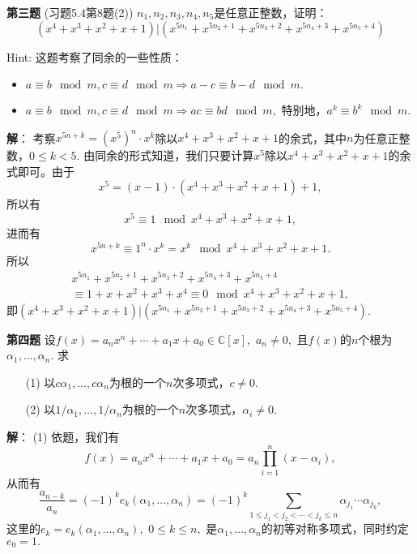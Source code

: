 \fi  %

\newpageorvspace

{\bf 第三题} (习题5.4第8题(2)) $n_1, n_2, n_3, n_4, n_5$是任意正整数，证明：
$$(x^4 + x^3 + x^2 + x + 1) | (x^{5n_1} + x^{5n_2+1} + x^{5n_3+2} + x^{5n_4+3} + x^{5n_5+4})$$

Hint: 这题考察了同余的一些性质：
\begin{itemize}
\item $a \equiv b \mod{m}, c \equiv d \mod{m} \Rightarrow a-c \equiv b-d \mod{m}.$
\item $a \equiv b \mod{m}, c \equiv d \mod{m} \Rightarrow ac \equiv bd \mod{m},$ 特别地，$a^k \equiv b^k \mod{m}.$
\end{itemize}

\ifIncludeAnswer

\newpageorvspace

{\bf 解}： 考察$x^{5n+k} = (x^5)^n \cdot x^k$除以$x^4 + x^3 + x^2 + x + 1$的余式，其中$n$为任意正整数，$0 \leq k < 5.$ 由同余的形式知道，我们只要计算$x^5$除以$x^4 + x^3 + x^2 + x + 1$的余式即可。由于
$$x^5 = (x-1) \cdot (x^4 + x^3 + x^2 + x + 1) + 1,$$
所以有
$$x^5 \equiv 1 \mod{x^4 + x^3 + x^2 + x + 1},$$
进而有
$$x^{5n+k} \equiv 1^n \cdot x^k = x^k \mod{x^4 + x^3 + x^2 + x + 1}.$$
所以
\begin{multline*}
x^{5n_1} + x^{5n_2+1} + x^{5n_3+2} + x^{5n_4+3} + x^{5n_5+4} \\
\equiv 1 + x + x^2 + x^3 + x^4 \equiv 0 \mod{x^4 + x^3 + x^2 + x + 1},
\end{multline*}
即$(x^4 + x^3 + x^2 + x + 1) | (x^{5n_1} + x^{5n_2+1} + x^{5n_3+2} + x^{5n_4+3} + x^{5n_5+4}).$

\fi  %

\newpageorvspace

{\bf 第四题} 设$f(x) = a_n x^n + \cdots + a_1 x + a_0 \in \mathbb{C}[x],$ $a_n \neq 0,$ 且$f(x)$的$n$个根为$\alpha_1, \ldots, \alpha_n.$ 求
\begin{itemize}
\item[(1)] 以$c\alpha_1, \ldots, c\alpha_n$为根的一个$n$次多项式，$c \neq 0.$
\item[(2)] 以$1/\alpha_1, \ldots, 1/\alpha_n$为根的一个$n$次多项式，$\alpha_i \neq 0.$
\end{itemize}

\ifIncludeAnswer

\newpageorvspace

{\bf 解}： (1) 依题，我们有
$$f(x) = a_n x^n + \cdots + a_1 x + a_0 = a_n \prod\limits_{i=1}^n (x - \alpha_i),$$
从而有
$$
\dfrac{a_{n-k}}{a_n} = (-1)^k e_k(\alpha_1, \ldots, \alpha_n) = (-1)^k \sum\limits_{1 \leqslant j_{1} < j_{2} < \cdots < j_{k} \leqslant n} \alpha_{j_{1}} \dotsm \alpha_{j_{k}},
$$
这里的$e_k = e_k(\alpha_1, \ldots, \alpha_n),$ $0\leqslant k \leqslant n,$ 是$\alpha_1, \ldots, \alpha_n$的初等对称多项式，同时约定$e_0 = 1.$

